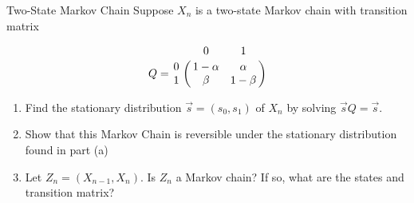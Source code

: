 \documentclass[11.5pt]{article}
\begin{document}


\begin{exercise}{Two-State Markov Chain}
Suppose $X_n$ is a two-state Markov chain with transition matrix

\[
Q = \bordermatrix{~ & 0 & 1 \cr
                  0 & 1-\alpha & \alpha \cr
                  1 & \beta & 1-\beta \cr}
\]
\begin{enumerate}
	\item Find the stationary distribution $\vec{s} = (s_0, s_1)$ of $X_n$ by solving $\vec{s} Q = \vec{s}$. 
	\item Show that this Markov Chain is reversible under the stationary distribution found in part (a)
	\item Let $Z_n = (X_{n-1}, X_n)$. Is $Z_n$ a Markov chain? If so, what are the states and transition matrix?
\end{enumerate}
\end{exercise}
\end{document}
